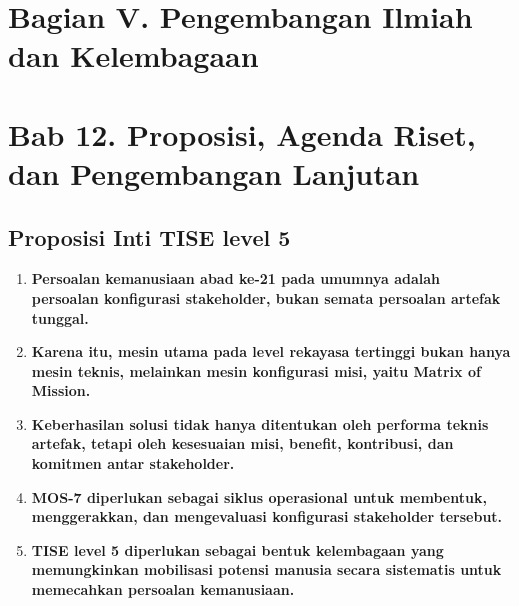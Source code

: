 \documentclass[
  letterpaper,
  DIV=11,
  numbers=noendperiod]{scrreprt}
\providecommand{\tightlist}{%
  \setlength{\itemsep}{0pt}\setlength{\parskip}{0pt}}
\begin{document}
\chapter*{Bagian V. Pengembangan Ilmiah dan
Kelembagaan}\label{bagian-v.-pengembangan-ilmiah-dan-kelembagaan}



\chapter*{Bab 12. Proposisi, Agenda Riset, dan Pengembangan
Lanjutan}\label{bab-12.-proposisi-agenda-riset-dan-pengembangan-lanjutan}


\section*{Proposisi Inti TISE level
5}\label{proposisi-inti-tise-level-5}


\begin{enumerate}
\def\labelenumi{\arabic{enumi}.}
\tightlist
\item
  \textbf{Persoalan kemanusiaan abad ke-21 pada umumnya adalah persoalan
  konfigurasi stakeholder, bukan semata persoalan artefak tunggal.}
\item
  \textbf{Karena itu, mesin utama pada level rekayasa tertinggi bukan
  hanya mesin teknis, melainkan mesin konfigurasi misi, yaitu Matrix of
  Mission.}
\item
  \textbf{Keberhasilan solusi tidak hanya ditentukan oleh performa
  teknis artefak, tetapi oleh kesesuaian misi, benefit, kontribusi, dan
  komitmen antar stakeholder.}
\item
  \textbf{MOS-7 diperlukan sebagai siklus operasional untuk membentuk,
  menggerakkan, dan mengevaluasi konfigurasi stakeholder tersebut.}
\item
  \textbf{TISE level 5 diperlukan sebagai bentuk kelembagaan yang
  memungkinkan mobilisasi potensi manusia secara sistematis untuk
  memecahkan persoalan kemanusiaan.}
\end{enumerate}
\end{document}
